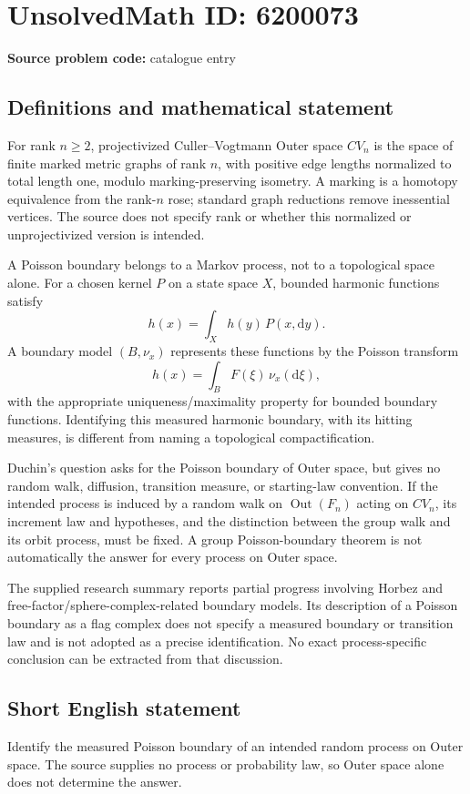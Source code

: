 \documentclass[11pt]{article}
\begin{document}
\section*{UnsolvedMath ID: 6200073}
\textbf{Source problem code:} catalogue entry
\subsection{Definitions and mathematical statement}
For rank \(n\ge2\), projectivized Culler--Vogtmann Outer space \(CV_n\) is the space of finite marked metric graphs of rank \(n\), with positive edge lengths normalized to total length one, modulo marking-preserving isometry. A marking is a homotopy equivalence from the rank-\(n\) rose; standard graph reductions remove inessential vertices. The source does not specify rank or whether this normalized or unprojectivized version is intended.

A Poisson boundary belongs to a Markov process, not to a topological space alone. For a chosen kernel \(P\) on a state space \(X\), bounded harmonic functions satisfy
\[
h(x)=\int_Xh(y)\,P(x,\mathrm dy).
\]
A boundary model \((B,\nu_x)\) represents these functions by the Poisson transform
\[
h(x)=\int_B F(\xi)\,\nu_x(\mathrm d\xi),
\]
with the appropriate uniqueness/maximality property for bounded boundary functions. Identifying this measured harmonic boundary, with its hitting measures, is different from naming a topological compactification.

Duchin's question asks for the Poisson boundary of Outer space, but gives no random walk, diffusion, transition measure, or starting-law convention. If the intended process is induced by a random walk on \(\operatorname{Out}(F_n)\) acting on \(CV_n\), its increment law and hypotheses, and the distinction between the group walk and its orbit process, must be fixed. A group Poisson-boundary theorem is not automatically the answer for every process on Outer space.

The supplied research summary reports partial progress involving Horbez and free-factor/sphere-complex-related boundary models. Its description of a Poisson boundary as a flag complex does not specify a measured boundary or transition law and is not adopted as a precise identification. No exact process-specific conclusion can be extracted from that discussion.
\subsection{Short English statement}
Identify the measured Poisson boundary of an intended random process on Outer space. The source supplies no process or probability law, so Outer space alone does not determine the answer.
\end{document}

